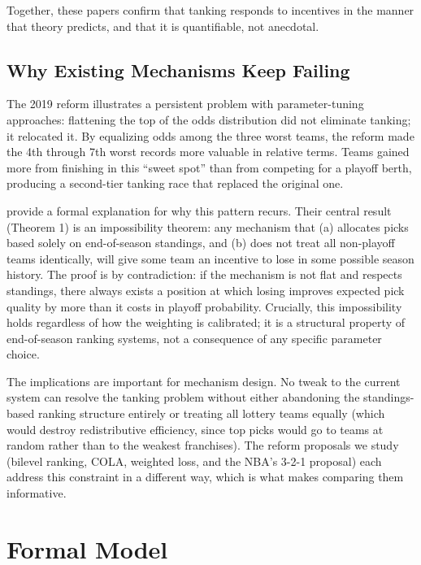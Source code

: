 \documentclass{article}
\begin{document}
Together, these papers confirm that tanking responds to incentives in the
manner that theory predicts, and that it is quantifiable, not anecdotal.

\subsection{Why Existing Mechanisms Keep Failing}

The 2019 reform illustrates a persistent problem with parameter-tuning
approaches: flattening the top of the odds distribution did not eliminate
tanking; it relocated it.
By equalizing odds among the three worst teams, the reform made the 4th
through 7th worst records more valuable in relative terms.
Teams gained more from finishing in this ``sweet spot'' than from competing
for a playoff berth, producing a second-tier tanking race that replaced the
original one.

\citet{banchio2020} provide a formal explanation for why this pattern recurs.
Their central result (Theorem 1) is an impossibility theorem: any mechanism
that (a) allocates picks based solely on end-of-season standings, and (b)
does not treat all non-playoff teams identically, will give some team an
incentive to lose in some possible season history.
The proof is by contradiction: if the mechanism is not flat and respects
standings, there always exists a position at which losing improves expected
pick quality by more than it costs in playoff probability.
Crucially, this impossibility holds regardless of how the weighting is
calibrated; it is a structural property of end-of-season ranking systems,
not a consequence of any specific parameter choice.

The implications are important for mechanism design.
No tweak to the current system can resolve the tanking problem without
either abandoning the standings-based ranking structure entirely or treating
all lottery teams equally (which would destroy redistributive efficiency,
since top picks would go to teams at random rather than to the weakest
franchises).
The reform proposals we study (bilevel ranking, COLA, weighted loss, and the
NBA's 3-2-1 proposal) each address this constraint in a different way, which
is what makes comparing them informative.


\section{Formal Model}
\end{document}
